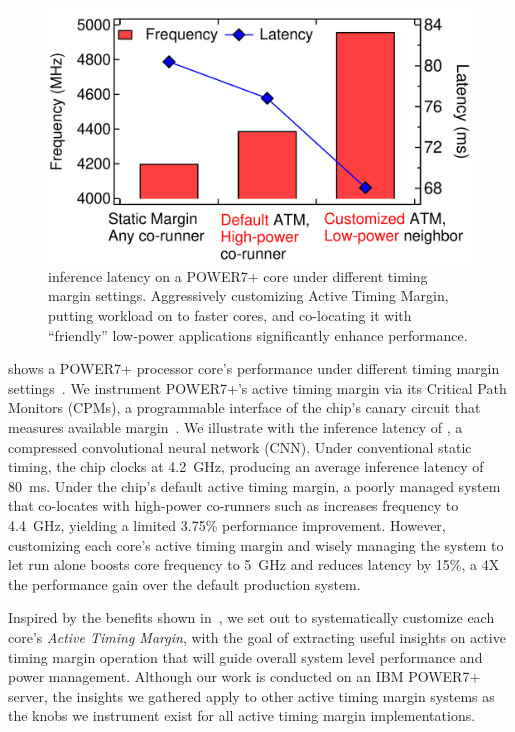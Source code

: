 \begin{figure}[t]
  \centering
  \includegraphics[trim=0 0 0 0,clip,width=.75\linewidth]{graphs/process//noisy-latency.pdf}
  \caption{ inference latency on a POWER7+ core under different timing margin settings. Aggressively customizing Active Timing Margin, putting workload on to faster cores, and co-locating it with ``friendly'' low-power applications significantly enhance performance.}

  \label{fig:motivate-latency}
\end{figure}

 shows a POWER7+ processor core's performance under different timing margin settings~\cite{sinharoy2011power7, floyd2011introducing}. We instrument POWER7+'s active timing margin via its Critical Path Monitors (CPMs), a programmable interface of the chip's canary circuit that measures available margin~\cite{lefurgy2011active, drake2013single}. We illustrate with the inference latency of , a compressed convolutional neural network (CNN). Under conventional static timing, the chip clocks at 4.2~GHz, producing an average inference latency of 80~ms. Under the chip's default active timing margin, a poorly managed system that co-locates  with high-power co-runners such as  increases frequency to 4.4~GHz, yielding a limited 3.75\% performance improvement. However, customizing each core's active timing margin and wisely managing the system to let  run alone boosts core frequency to 5~GHz and reduces latency by 15\%, a 4X the performance gain over the default production system.

Inspired by the benefits shown in~, we set out to systematically customize each core's \emph{Active Timing Margin}, with the goal of extracting useful insights on active timing margin operation that will guide overall system level performance and power management. Although our work is conducted on an IBM POWER7+ server, the insights we gathered apply to other active timing margin systems as the knobs we instrument exist for all active timing margin implementations.

